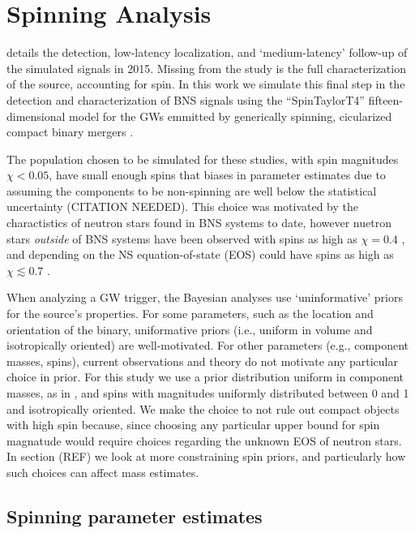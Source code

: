 \section{Spinning Analysis}

\citet{2013arXiv1304.0670L} details the detection, low-latency localization, and `medium-latency' follow-up of the simulated signals in 2015.  Missing from the study is the full characterization of the source, accounting for spin.  In this work we simulate this final step in the detection and characterization of BNS signals using the ``SpinTaylorT4'' fifteen-dimensional model for the GWs emmitted by generically spinning, cicularized compact binary mergers \cite{Buonanno_2003,Buonanno_2009}. 

The population chosen to be simulated for these studies, with spin magnitudes $\chi < 0.05$, have small enough spins that biases in parameter estimates due to assuming the components to be non-spinning are well below the statistical uncertainty (CITATION NEEDED).  This choice was motivated by the charactistics of neutron stars found in BNS systems to date, however nuetron stars \emph{outside} of BNS systems have been observed with spins as high as $\chi = 0.4$ \cite{Hessels_2006,Brown_2012}, and depending on the NS equation-of-state (EOS) could have spins as high as $\chi \lesssim 0.7$ \cite{Lo_2011}.

When analyzing a GW trigger, the Bayesian analyses use `uninformative' priors for the source's properties.  For some parameters, such as the location and orientation of the binary, uniformative priors (i.e., uniform in volume and isotropically oriented) are well-motivated.  For other parameters (e.g., component masses, spins), current observations and theory do not motivate any particular choice in prior.  For this study we use a prior distribution uniform in component masses, as in \citet{2013arXiv1304.0670L}, and spins with magnitudes uniformly distributed between 0 and 1 and isotropically oriented.  We make the choice to not rule out compact objects with high spin because, since choosing any particular upper bound for spin magnatude would require choices regarding the unknown EOS of neutron stars.  In section (REF) we look at more constraining spin priors, and particularly how such choices can affect mass estimates.

\subsection{Spinning parameter estimates}


